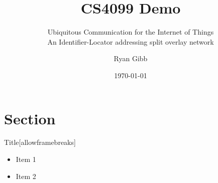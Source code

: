 \documentclass{beamer}
\title{CS4099 Demo}
\subtitle{Ubiquitous Communication for the Internet of Things\\An Identifier-Locator addressing split overlay network}
\author{Ryan Gibb}
\institute{University of St Andrews}
\date{\today}
\begin{document}
\begin{frame}
	\maketitle
\end{frame}

\section{Section}

\begin{frame}{Title}[allowframebreaks]
\begin{itemize}
    \item Item 1
    \pause
    \item Item 2
    \pause
\end{itemize}
\end{frame}
\end{document}
